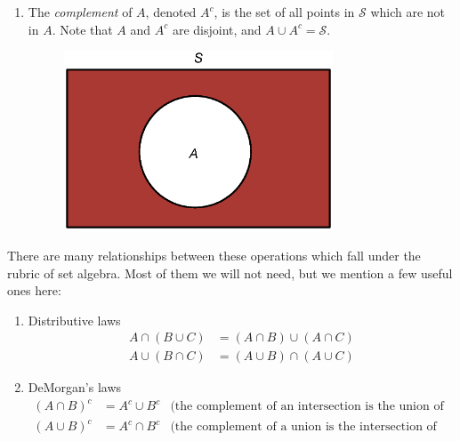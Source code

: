 \documentclass[12pt]{article}
\theoremstyle{definition}
\theoremstyle{remark}
\def\cals{{\mathcal S}}
\begin{document}
\begin{enumerate}
\begin{figure}[H]
\end{figure}
\item The \emph{complement} of $A$, denoted $A^c$, is the set of all points in $\cals$ which are not in $A$. Note that $A$ and $A^c$ are disjoint, and $A \cup A^c = \cals$.
\begin{figure}[H]
\centering
\includegraphics[width=8cm]{Acomplement}
\end{figure}
\end{enumerate}
There are many relationships between these operations which fall under the rubric of set algebra. Most of them we will not need, but we mention a few useful ones here:
\begin{enumerate}
\item Distributive laws
\begin{align*}
A \cap (B \cup C) &= (A \cap B) \cup (A \cap C) \\
A \cup (B \cap C) &= (A \cup B) \cap (A \cup C)
\end{align*}
\item DeMorgan's laws
\begin{align*}
(A \cap B)^c &= A^c \cup B^c &\text{(the complement of an intersection is the union of the complements)}\\
(A \cup B)^c &= A^c \cap B^c &\text{(the complement of a union is the intersection of the complements)}
\end{align*}
\end{enumerate}
\end{document}
